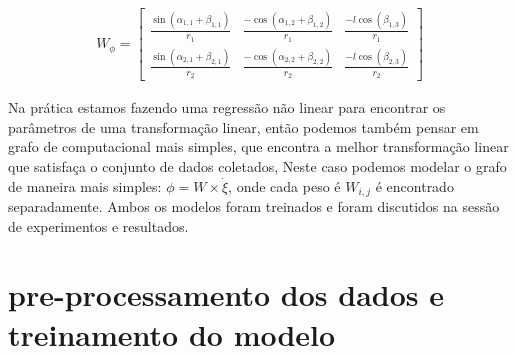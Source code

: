 \begin{align}
    W_{\phi} = 
    \begin{bmatrix}
        \frac{\sin(\alpha_{1,1} + \beta_{1,1})}{r_1} &  \frac{-\cos(\alpha_{1,2} + \beta_{1,2})}{r_1} & \frac{-l\cos(\beta_{1,3})}{r_1} \\
        \frac{\sin(\alpha_{2,1} + \beta_{2,1})}{r_2} &  \frac{-\cos(\alpha_{2,2} + \beta_{2,2})}{r_2} & \frac{-l\cos(\beta_{2,3})}{r_2}
    \end{bmatrix}
\end{align}

Na prática estamos fazendo uma regressão não linear para encontrar
os parâmetros de uma transformação linear, então podemos também pensar em
grafo de computacional mais simples, que encontra  a melhor transformação
linear que satisfaça o conjunto de dados coletados,
Neste caso podemos modelar o grafo de maneira mais simples: $\phi=W \times \dot{\xi}$,
onde cada peso é $W_{i,j}$ é encontrado separadamente. Ambos os modelos foram
treinados e foram discutidos na sessão de experimentos e resultados.


\section{pre-processamento dos dados e treinamento do modelo}
